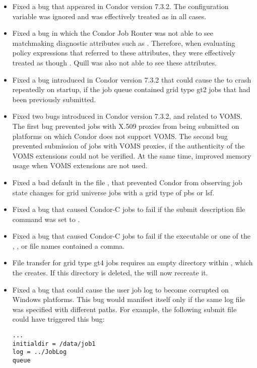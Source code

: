 \begin{itemize}
\item Fixed a bug that appeared in Condor version 7.3.2.
The configuration variable
 was ignored and was effectively
treated as  in all cases.

\item Fixed a bug in which the Condor Job Router was not able
to see matchmaking diagnostic attributes such as .
Therefore, when evaluating policy
expressions that referred to these attributes, they were effectively
treated as though .
Quill was also not able to see these attributes.

\item Fixed a bug introduced in Condor version 7.3.2 that could cause the
 to crash repeatedly on startup,
if the job queue
contained grid type gt2 jobs that had been previously submitted.

\item Fixed two bugs introduced in Condor version 7.3.2,
and related to VOMS. 
The first bug
prevented jobs with X.509 proxies from being submitted on platforms
on which Condor does not support VOMS.
The second bug prevented submission
of jobs with VOMS proxies, if the authenticity of the VOMS extensions
could not be verified.
At the same time, improved memory usage when VOMS extensions are not used.

\item Fixed a bad default in the file ,
that prevented
Condor from observing job state changes for grid universe jobs
with a grid type of pbs or lsf.

\item Fixed a bug that caused Condor-C jobs to fail if
the submit description file command 
was set to .

\item Fixed a bug that caused Condor-C jobs to fail if the executable
or one of the , , or  file names
contained a comma.

\item File transfer for grid type gt4 jobs requires an empty directory
within , which the  creates. 
If this directory is deleted, the  will now recreate it.

\item Fixed a bug that could cause the user job log to become
  corrupted on Windows platforms.  This bug would manifest itself only if the
  same log file was specified with different paths.  For example, the
  following submit file could have triggered this bug:
\begin{verbatim}
...
initialdir = /data/job1
log = ../JobLog
queue


\end{verbatim}
\end{itemize}
